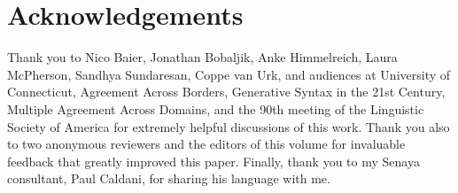 \documentclass[output=paper
,modfonts
,nonflat]{langsci/langscibook}
\begin{document}
\section*{Acknowledgements}

Thank you to Nico Baier, Jonathan Bobaljik, Anke Himmelreich, Laura McPherson, Sandhya Sundaresan, Coppe van Urk, and audiences at University of Connecticut, Agreement Across Borders, Generative Syntax in the 21st Century, Multiple Agreement Across Domains, and the 90th meeting of the Linguistic Society of America for extremely helpful discussions of this work. Thank you also to two anonymous reviewers and the editors of this volume for invaluable feedback that greatly improved this paper. Finally, thank you to my Senaya consultant, Paul Caldani, for sharing his language with me.


{\sloppy
\printbibliography[heading=subbibliography,notkeyword=this]
}
\end{document}
